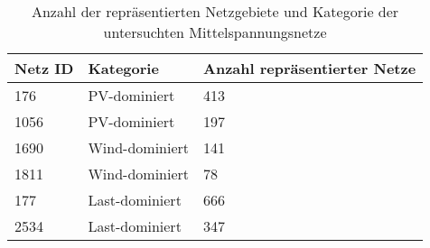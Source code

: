 {
\renewcommand{\arraystretch}{1.2}%
\begin{table}[H]
	\begin{center}
		\caption{Anzahl der repräsentierten Netzgebiete und Kategorie der untersuchten Mittelspannungsnetze}
		\begin{tabu} to \textwidth {X[1] X[1] X[1, r] }
			\toprule
			Netz ID    & Kategorie      & Anzahl repräsentierter Netze \\ \midrule
			\num{176}  & PV-dominiert   & \num{413}                    \\
			\num{1056} & PV-dominiert   & \num{197}                    \\
			\num{1690} & Wind-dominiert & \num{141}                    \\
			\num{1811} & Wind-dominiert & \num{78}                     \\
			\num{177}  & Last-dominiert & \num{666}                    \\
			\num{2534} & Last-dominiert & \num{347}                    \\ \bottomrule
		\end{tabu}
		\label{tab:grid_IDs}
	\end{center}
	\vspace{-3mm}%
\end{table}
}